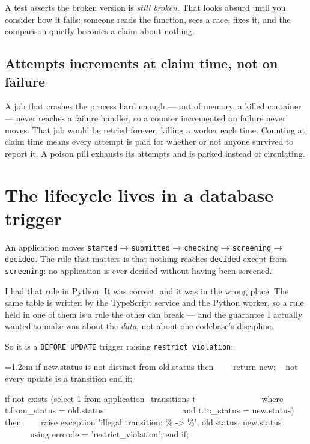 \documentclass[11pt,a4paper]{article}
\newenvironment{code}%
  {\par\vspace{0.5em}\begingroup\footnotesize\ttfamily\leftskip=1.2em%
   \parskip=0pt\baselineskip=1.05\baselineskip\obeylines}%
  {\endgroup\par\vspace{0.5em}}
\begin{document}
A test asserts the broken version is \emph{still broken}. That looks absurd until
you consider how it fails: someone reads the function, sees a race, fixes it, and
the comparison quietly becomes a claim about nothing.

\subsection{Attempts increments at claim time, not on failure}

A job that crashes the process hard enough --- out of memory, a killed container
--- never reaches a failure handler, so a counter incremented on failure never
moves. That job would be retried forever, killing a worker each time. Counting
at claim time means every attempt is paid for whether or not anyone survived to
report it. A poison pill exhausts its attempts and is parked instead of
circulating.

\section{The lifecycle lives in a database trigger}

An application moves \texttt{started} → \texttt{submitted} → \texttt{checking} →
\texttt{screening} → \texttt{decided}. The rule that matters is that nothing
reaches \texttt{decided} except from \texttt{screening}: no application is ever
decided without having been screened.

I had that rule in Python. It was correct, and it was in the wrong place. The
same table is written by the TypeScript service and the Python worker, so a rule
held in one of them is a rule the other can break --- and the guarantee I
actually wanted to make was about the \emph{data}, not about one codebase's
discipline.

So it is a \texttt{BEFORE UPDATE} trigger raising \texttt{restrict\_violation}:

\begin{code}
if new.status is not distinct from old.status then
~~~~return new;  -- not every update is a transition
end if;

if not exists (select 1 from application\_transitions t
~~~~~~~~~~~~~~~where t.from\_status = old.status
~~~~~~~~~~~~~~~~~~and t.to\_status = new.status) then
~~~~raise exception 'illegal transition: \% -> \%', old.status, new.status
~~~~~~using errcode = 'restrict\_violation';
end if;
\end{code}
\end{document}

